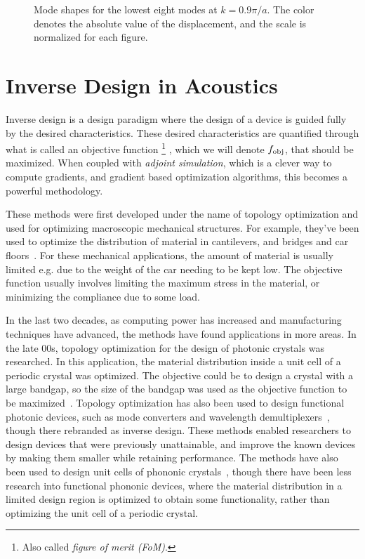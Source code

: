 \begin{figure}[htpb]
	\caption{%
		Mode shapes for the lowest eight modes at $k=0.9 \pi / a$.
		The color denotes the absolute value of the displacement,
		and the scale is normalized for each figure.
	}%
	\label{fig:modeshapes}
\end{figure}

\chapter{Inverse Design in Acoustics}

Inverse design is a design paradigm where the design of a device is guided fully by
the desired characteristics.
These desired characteristics are quantified through what is called an objective
function%
\footnote{Also called \emph{figure of merit (FoM)}.}%
, which we will denote $f_\text{obj}$,
that should be maximized.
When coupled with \emph{adjoint simulation}, which is a clever way to compute
gradients, and gradient based optimization
algorithms, this becomes a powerful methodology.

These methods were first developed under the name of topology optimization and
used for optimizing macroscopic mechanical structures.
For example, they've been used to optimize the distribution of material in
cantilevers, and bridges and car floors~\cite{Bendse1995}.
For these mechanical applications, the amount of material is usually limited e.g. due to
the weight of the car needing to be kept low.
The objective function usually involves limiting the maximum stress in the
material, or minimizing the compliance due to some load.

In the last two decades, as computing power has increased and manufacturing
techniques have advanced, the methods have found applications in more areas.
In the late 00s, topology optimization for the design of photonic crystals was
researched.
In this application, the material distribution inside a unit cell of a periodic crystal was
optimized.
The objective could be to design a crystal with a large bandgap,
so the size of the bandgap was used as the objective function to be
maximized~\cite{jensen_topology_2011}.
Topology optimization has also been used to design functional photonic devices, such
as mode converters and wavelength demultiplexers~\cite{molesky_inverse_2018},
though there rebranded as inverse design.
These methods enabled researchers to design devices that were previously
unattainable, and improve the known devices by making them smaller while
retaining performance.
The methods have also been used to design unit cells of phononic
crystals~\cite{yi_comprehensive_2016,li_topology_2019}, though there have been
less research into functional phononic devices, where the material
distribution in a limited design region is optimized to obtain some
functionality, rather than optimizing the unit cell of a periodic crystal.

